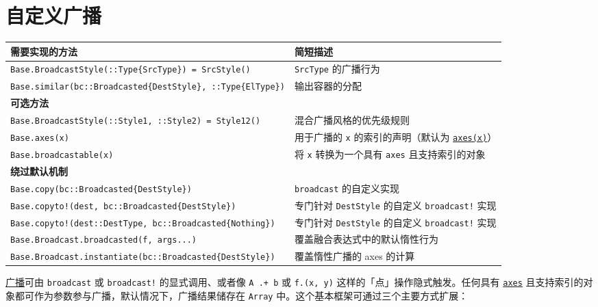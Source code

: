 \hypertarget{8927705294232715192}{}


\section{自定义广播}




\begin{table}[h]

\begin{tabulary}{\linewidth}{|L|L|}
\hline
需要实现的方法 & 简短描述 \\
\hline
\texttt{Base.BroadcastStyle(::Type\{SrcType\}) = SrcStyle()} & \texttt{SrcType} 的广播行为 \\
\hline
\texttt{Base.similar(bc::Broadcasted\{DestStyle\}, ::Type\{ElType\})} & 输出容器的分配 \\
\hline
\textbf{可选方法} &  \\
\hline
\texttt{Base.BroadcastStyle(::Style1, ::Style2) = Style12()} & 混合广播风格的优先级规则 \\
\hline
\texttt{Base.axes(x)} & 用于广播的 \texttt{x} 的索引的声明（默认为 \hyperlink{7074821531920287868}{\texttt{axes(x)}}） \\
\hline
\texttt{Base.broadcastable(x)} & 将 \texttt{x} 转换为一个具有 \texttt{axes} 且支持索引的对象 \\
\hline
\textbf{绕过默认机制} &  \\
\hline
\texttt{Base.copy(bc::Broadcasted\{DestStyle\})} & \texttt{broadcast} 的自定义实现 \\
\hline
\texttt{Base.copyto!(dest, bc::Broadcasted\{DestStyle\})} & 专门针对 \texttt{DestStyle} 的自定义 \texttt{broadcast!} 实现 \\
\hline
\texttt{Base.copyto!(dest::DestType, bc::Broadcasted\{Nothing\})} & 专门针对 \texttt{DestStyle} 的自定义 \texttt{broadcast!} 实现 \\
\hline
\texttt{Base.Broadcast.broadcasted(f, args...)} & 覆盖融合表达式中的默认惰性行为 \\
\hline
\texttt{Base.Broadcast.instantiate(bc::Broadcasted\{DestStyle\})} & 覆盖惰性广播的 axes 的计算 \\
\hline
\end{tabulary}

\end{table}



\href{@ref}{广播}可由 \texttt{broadcast} 或 \texttt{broadcast!} 的显式调用、或者像 \texttt{A .+ b} 或 \texttt{f.(x, y)} 这样的「点」操作隐式触发。任何具有 \hyperlink{7074821531920287868}{\texttt{axes}} 且支持索引的对象都可作为参数参与广播，默认情况下，广播结果储存在 \texttt{Array} 中。这个基本框架可通过三个主要方式扩展：



